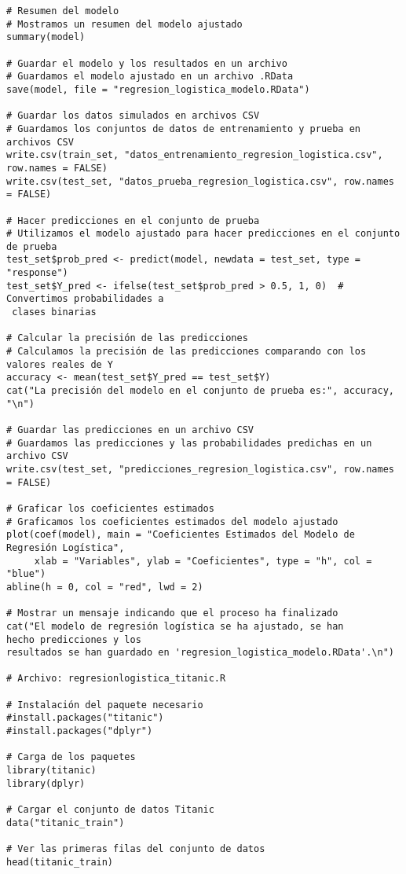 \begin{verbatim}
# Resumen del modelo
# Mostramos un resumen del modelo ajustado
summary(model)

# Guardar el modelo y los resultados en un archivo
# Guardamos el modelo ajustado en un archivo .RData
save(model, file = "regresion_logistica_modelo.RData")

# Guardar los datos simulados en archivos CSV
# Guardamos los conjuntos de datos de entrenamiento y prueba en archivos CSV
write.csv(train_set, "datos_entrenamiento_regresion_logistica.csv", row.names = FALSE)
write.csv(test_set, "datos_prueba_regresion_logistica.csv", row.names = FALSE)

# Hacer predicciones en el conjunto de prueba
# Utilizamos el modelo ajustado para hacer predicciones en el conjunto de prueba
test_set$prob_pred <- predict(model, newdata = test_set, type = "response")
test_set$Y_pred <- ifelse(test_set$prob_pred > 0.5, 1, 0)  # Convertimos probabilidades a
 clases binarias

# Calcular la precisión de las predicciones
# Calculamos la precisión de las predicciones comparando con los valores reales de Y
accuracy <- mean(test_set$Y_pred == test_set$Y)
cat("La precisión del modelo en el conjunto de prueba es:", accuracy, "\n")

# Guardar las predicciones en un archivo CSV
# Guardamos las predicciones y las probabilidades predichas en un archivo CSV
write.csv(test_set, "predicciones_regresion_logistica.csv", row.names = FALSE)

# Graficar los coeficientes estimados
# Graficamos los coeficientes estimados del modelo ajustado
plot(coef(model), main = "Coeficientes Estimados del Modelo de Regresión Logística", 
     xlab = "Variables", ylab = "Coeficientes", type = "h", col = "blue")
abline(h = 0, col = "red", lwd = 2)

# Mostrar un mensaje indicando que el proceso ha finalizado
cat("El modelo de regresión logística se ha ajustado, se han 
hecho predicciones y los 
resultados se han guardado en 'regresion_logistica_modelo.RData'.\n")

# Archivo: regresionlogistica_titanic.R

# Instalación del paquete necesario
#install.packages("titanic")
#install.packages("dplyr")

# Carga de los paquetes
library(titanic)
library(dplyr)

# Cargar el conjunto de datos Titanic
data("titanic_train")

# Ver las primeras filas del conjunto de datos
head(titanic_train)


\end{verbatim}
